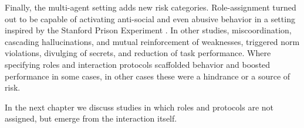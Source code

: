 Finally, the multi-agent setting adds new risk categories. Role-assignment turned out to be capable of activating anti-social and even abusive behavior in a setting inspired by the Stanford Prison Experiment \citep{campedelli2024want}. In other studies, miscoordination, cascading hallucinations, and mutual reinforcement of weaknesses, triggered norm violations, divulging of secrets, and reduction of task performance. Where specifying roles and interaction protocols scaffolded behavior and boosted performance in some cases, in other cases these were a hindrance or a source of risk. 

In the next chapter we discuss studies in which roles and protocols are not assigned, but emerge from the interaction itself.




